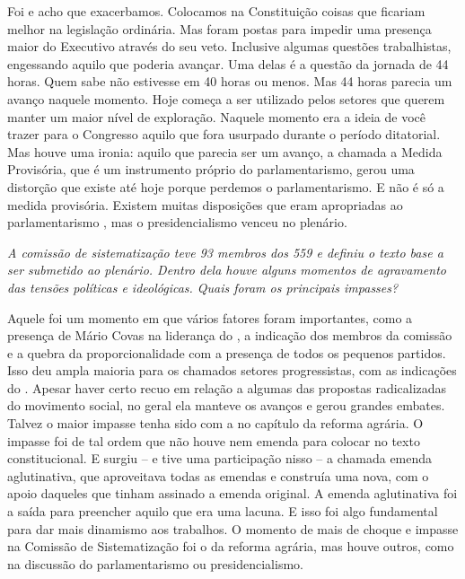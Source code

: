 Foi e acho que exacerbamos. Colocamos na Constituição
coisas que ficariam melhor na legislação ordinária. Mas foram postas
para impedir uma presença maior do Executivo através do seu veto.
Inclusive algumas questões trabalhistas, engessando aquilo que poderia
avançar. Uma delas é a questão da jornada de 44 horas. Quem sabe não
estivesse em 40 horas ou menos. Mas 44 horas parecia um avanço naquele
momento. Hoje começa a ser utilizado pelos setores que querem manter um
maior nível de exploração. Naquele momento era a ideia de você trazer
para o Congresso aquilo que fora usurpado durante o período ditatorial.
Mas houve uma ironia: aquilo que parecia ser um avanço, a chamada a
Medida Provisória, que é um instrumento próprio do parlamentarismo,
gerou uma distorção que existe até hoje porque perdemos o
parlamentarismo. E não é só a medida provisória. Existem muitas
disposições que eram apropriadas ao parlamentarismo , mas o
presidencialismo venceu no plenário.

\medskip

\noindent\emph{A comissão de sistematização teve 93 membros dos 559 e definiu o
texto base a ser submetido ao plenário. Dentro dela houve alguns
momentos de agravamento das tensões políticas e ideológicas. Quais foram
os principais impasses?}

Aquele foi um momento em que vários fatores foram
importantes, como a presença de Mário Covas na liderança do , a
indicação dos membros da comissão e a quebra da proporcionalidade com a
presença de todos os pequenos partidos. Isso deu ampla maioria para os
chamados setores progressistas, com as indicações do . Apesar haver
certo recuo em relação a algumas das propostas radicalizadas do
movimento social, no geral ela manteve os avanços e gerou grandes
embates. Talvez o maior impasse tenha sido com a  no capítulo da
reforma agrária. O impasse foi de tal ordem que não houve nem emenda
para colocar no texto constitucional. E surgiu -- e tive uma
participação nisso -- a chamada emenda aglutinativa, que aproveitava
todas as emendas e construía uma nova, com o apoio daqueles que tinham
assinado a emenda original. A emenda aglutinativa foi a saída para
preencher aquilo que era uma lacuna. E isso foi algo fundamental para
dar mais dinamismo aos trabalhos. O momento de mais de choque e impasse
na Comissão de Sistematização foi o da reforma agrária, mas houve
outros, como na discussão do parlamentarismo ou presidencialismo.

\medskip

